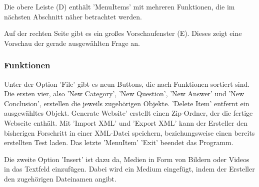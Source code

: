 Die obere Leiste (D) enthält 'MenuItems' mit mehreren Funktionen, die im nächsten Abschnitt näher betrachtet werden.

Auf der rechten Seite gibt es ein großes Vorschaufenster (E). 
Dieses zeigt eine Vorschau der gerade ausgewählten Frage an.


\subsubsection{Funktionen}
Unter der Option 'File' gibt es neun Buttons, die nach Funktionen sortiert sind. 
Die ersten vier, also 'New Category', 'New Question', 'New Answer' und 'New Conclusion', erstellen die jeweils zugehörigen Objekte.
'Delete Item' entfernt ein ausgewähltes Objekt.
Generate Website' erstellt einen Zip-Ordner, der die fertige Webseite enthält.
Mit 'Import XML' und 'Export XML' kann der Ersteller den bisherigen Forschritt in einer XML-Datei speichern, beziehungsweise einen bereits erstellten Test laden.
Das letzte 'MenuItem' 'Exit'  beendet das Programm.

Die zweite Option 'Insert' ist dazu da, Medien in Form von Bildern oder Videos in das Textfeld einzufügen. 
Dabei wird ein Medium eingefügt, indem der Ersteller den zugehörigen Dateinamen angibt.
 
